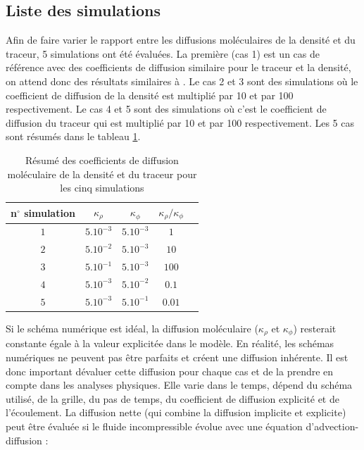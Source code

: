 \documentclass[a4paper,12pt]{article}
\begin{document}
    \subsection{Liste des simulations}
    Afin de faire varier le rapport entre les diffusions moléculaires de la densité et du traceur, 5 simulations ont été évaluées. La première (cas 1) est un cas de référence avec des coefficients de diffusion similaire pour le traceur et la densité, on attend donc des résultats similaires à \cite{penney_diapycnal_2020}. Le cas 2 et 3 sont des simulations où le coefficient de diffusion de la densité est  multiplié par 10 et par 100 respectivement. Le cas 4 et 5 sont des simulations où c'est le coefficient de diffusion du traceur qui est multiplié par 10 et par 100 respectivement. Les 5 cas sont résumés dans le tableau \ref{sim}.
    \begin{center}
    \begin{table}[h]
        \centering
        \renewcommand{\arraystretch}{1.5} %
        \setlength{\tabcolsep}{0.5cm} %
        \begin{tabular}{|c|c|c|c|c|}
        \hline
         n$^\circ$ simulation & $\kappa_{\rho}$ & $\kappa_{\phi}$ & $\kappa_{\rho}/\kappa_{\phi}$ \\
         \hline
         $1$ & $5.10^{-3}$ & $5.10^{-3}$ & $1$\\
         \hline
         $2$ & $5.10^{-2}$ & $5.10^{-3}$ & $10$ \\
         \hline
         $3$ & $5.10^{-1}$ & $5.10^{-3}$ & $100$\\
         \hline
         $4$ & $5.10^{-3}$ & $5.10^{-2}$ & $0.1$\\
         \hline
         $5$ & $5.10^{-3}$ & $5.10^{-1}$ & $0.01$\\
         \hline
        \end{tabular}
        \caption{Résumé des coefficients de diffusion moléculaire de la densité et du traceur pour les cinq simulations}
        \label{sim}
    \end{table}
    \end{center}
    Si le schéma numérique est idéal, la diffusion moléculaire ($\kappa_{\rho}$ et $\kappa_{\phi}$) resterait constante égale à la valeur explicitée dans le modèle. En réalité, les schémas numériques ne peuvent pas être parfaits et créent une diffusion inhérente. Il est donc important dévaluer cette diffusion pour chaque cas et de la prendre en compte dans les analyses physiques. Elle varie dans le temps, dépend du schéma utilisé, de la grille, du pas de temps, du coefficient de diffusion explicité et de l'écoulement. La diffusion nette (qui combine la diffusion implicite et explicite) peut être évaluée si le fluide incompressible évolue avec une équation d'advection-diffusion :
\end{document}
